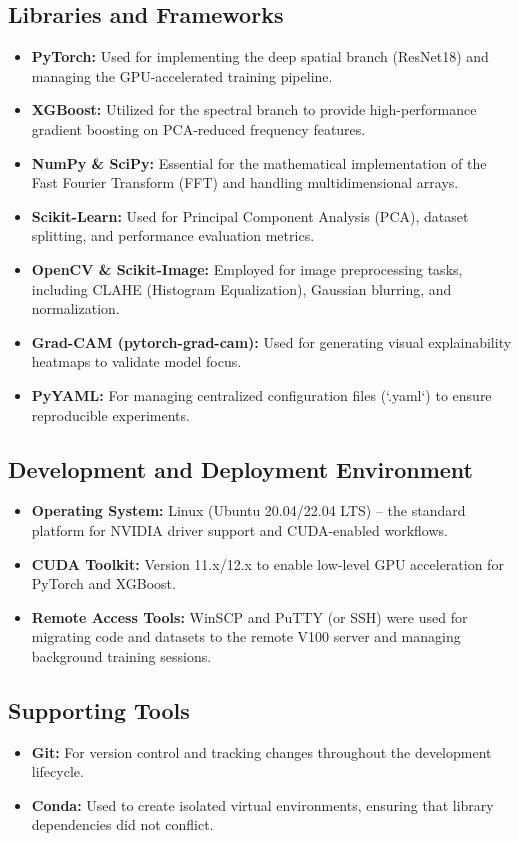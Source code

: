 \subsection{Libraries and Frameworks}
\begin{itemize}
    \item \textbf{PyTorch:} Used for implementing the deep spatial branch (ResNet18) and managing the GPU-accelerated training pipeline.
    \item \textbf{XGBoost:} Utilized for the spectral branch to provide high-performance gradient boosting on PCA-reduced frequency features.
    \item \textbf{NumPy \& SciPy:} Essential for the mathematical implementation of the Fast Fourier Transform (FFT) and handling multidimensional arrays.
    \item \textbf{Scikit-Learn:} Used for Principal Component Analysis (PCA), dataset splitting, and performance evaluation metrics.
    \item \textbf{OpenCV \& Scikit-Image:} Employed for image preprocessing tasks, including CLAHE (Histogram Equalization), Gaussian blurring, and normalization.
    \item \textbf{Grad-CAM (pytorch-grad-cam):} Used for generating visual explainability heatmaps to validate model focus.
    \item \textbf{PyYAML:} For managing centralized configuration files (`.yaml`) to ensure reproducible experiments.
\end{itemize}

\subsection{Development and Deployment Environment}
\begin{itemize}
    \item \textbf{Operating System:} Linux (Ubuntu 20.04/22.04 LTS) – the standard platform for NVIDIA driver support and CUDA-enabled workflows.
    \item \textbf{CUDA Toolkit:} Version 11.x/12.x to enable low-level GPU acceleration for PyTorch and XGBoost.
    \item \textbf{Remote Access Tools:} WinSCP and PuTTY (or SSH) were used for migrating code and datasets to the remote V100 server and managing background training sessions.
\end{itemize}

\subsection{Supporting Tools}
\begin{itemize}
    \item \textbf{Git:} For version control and tracking changes throughout the development lifecycle.
    \item \textbf{Conda:} Used to create isolated virtual environments, ensuring that library dependencies did not conflict.
\end{itemize}

